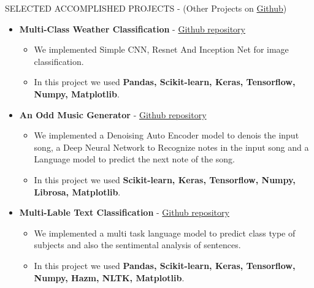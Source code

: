 \documentclass[]{CV}
\begin{document}
\begin{section}{SELECTED ACCOMPLISHED PROJECTS { - (Other Projects on \href{https://github.com/amirkasaei}{Github})}}
\begin{itemize}
     \item \textbf{Multi-Class Weather Classification} - \href{https://github.com/amirkasaei/Multi-Class-Weather-Classification}{Github repository}
   \begin{itemize}
        \item We implemented Simple CNN, Resnet And Inception Net for image classification.\vspace{-2mm}
        \item In this project we used \textbf{Pandas, Scikit-learn, Keras, Tensorflow, Numpy, Matplotlib}.
    \end{itemize}
    
\pagebreak  

\item \textbf{An Odd Music Generator} - \href{https://github.com/amirkasaei/An-Odd-Music-Generator}{Github repository}
   \begin{itemize}
        \item We implemented a Denoising Auto Encoder model to denois the input song, a Deep Neural Network to Recognize notes in the input song and a Language model to predict the next note of  the song.\vspace{-2mm}
        \item In this project we used \textbf{Scikit-learn, Keras, Tensorflow, Numpy, Librosa, Matplotlib}.
    \end{itemize} 
    
      
    
    
   \item \textbf{Multi-Lable Text Classification} - \href{https://github.com/amirkasaei/Multi-Lable-Text-Classification}{Github repository}
   \begin{itemize}
        \item We implemented a multi task language model to predict class type of subjects and also the sentimental analysis of sentences.\vspace{-2mm}
        \item In this project we used \textbf{Pandas, Scikit-learn, Keras, Tensorflow, Numpy, Hazm, NLTK, Matplotlib}.
    \end{itemize}


\end{itemize}
\end{section}
\end{document}

